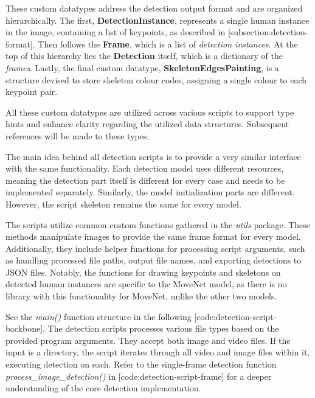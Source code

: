 
These custom datatypes address the detection output format and are organized hierarchically. The first, {\bf DetectionInstance}, represents a single human instance in the image, containing a list of keypoints, as described in [subsection:detection-format]. Then follows the {\bf Frame}, which is a list of {\em detection instances}. At the top of this hierarchy lies the {\bf Detection} itself, which is a dictionary of the {\em frames}. Lastly, the final custom datatype, {\bf SkeletonEdgesPainting}, is a structure devised to store skeleton colour codes, assigning a single colour to each keypoint pair.

All these custom datatypes are utilized across various scripts to support type hints and enhance clarity regarding the utilized data structures. Subsequent references will be made to these types.

The main idea behind all detection scripts is to provide a very similar interface with the same functionality. Each detection model uses different resources, meaning the detection part itself is different for every case and needs to be implemented separately. Similarly, the model initialization parts are different. However, the script skeleton remains the same for every model.

The scripts utilize common custom functions gathered in the {\it utils} package. These methods manipulate images to provide the same frame format for every model. Additionally, they include helper functions for processing script arguments, such as handling processed file paths, output file names, and exporting detections to JSON files. Notably, the functions for drawing keypoints and skeletons on detected human instances are specific to the MoveNet model, as there is no library with this functionality for MoveNet, unlike the other two models.

See the {\it main()} function structure in the following [code:detection-script-backbone]. The detection scripts processes various file types based on the provided program arguments. They accept both image and video files. If the input is a directory, the script iterates through all video and image files within it, executing detection on each. Refer to the single-frame detection function {\it process_image_detection()} in [code:detection-script-frame] for a deeper understanding of the core detection implementation.

